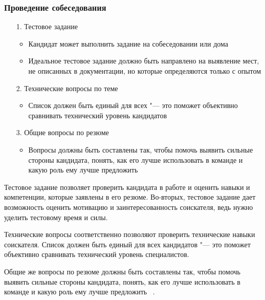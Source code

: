 \documentclass{../industrial-development}
\begin{document}
\begin{frame} \frametitle{Проведение собеседования}
	
	\begin{itemize}
		\item[1.] Тестовое задание
		\begin{itemize}
			\item Кандидат может выполнить задание на собеседовании или дома
			\item Идеальное тестовое задание должно быть направлено на выявление мест, не описанных в документации, но которые определяются только с опытом
		\end{itemize}
		\item[2.] Технические вопросы по теме
		\begin{itemize}
			\item Список должен быть единый для всех "--- это поможет объективно сравнивать технический уровень кандидатов
		\end{itemize}
		\item[3.] Общие вопросы по резюме
		\begin{itemize}
			\item Вопросы должны быть составлены так, чтобы помочь выявить сильные стороны кандидата, понять, как его лучше использовать в команде и какую роль ему лучше предложить
		\end{itemize}
	\end{itemize}
\end{frame}

\lecturenotes

Тестовое задание позволяет проверить кандидата в работе и оценить навыки и компетенции, которые заявлены в его резюме. Во-вторых, тестовое задание дает возможность оценить мотивацию и заинтересованность соискателя, ведь нужно уделить тестовому время и силы.

Технические вопросы соответственно позволяют проверить технические навыки соискателя. Список должен быть единый для всех кандидатов "--- это поможет объективно сравнивать технический уровень специалистов.

Общие же вопросы по резюме должны быть составлены так, чтобы помочь выявить сильные стороны кандидата, понять, как его лучше использовать в команде и какую роль ему лучше предложить
~\cite[с.~280--281]{Pererva}.
\end{document}

